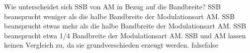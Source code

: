     {Wie unterscheidet sich SSB von AM in Bezug auf die Bandbreite?}
    {SSB beansprucht weniger als die halbe Bandbreite der Modulationsart AM.}
    {SSB beansprucht etwas mehr als die halbe Bandbreite der Modulationsart AM.}
    {SSB beansprucht etwa 1/4 Bandbreite der Modulationsart AM.}
    {SSB und AM lassen keinen Vergleich zu, da sie grundverschieden erzeugt werden.}
    {false}{false}
